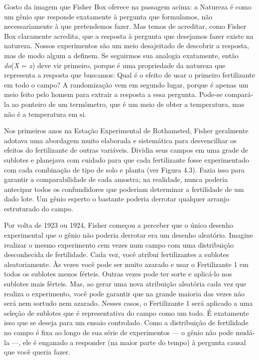 \documentclass[11pt,a5paper,twoside]{book}
\begin{document}
Gosto da imagem que Fisher Box oferece na passagem acima: a Natureza é como um gênio que responde exatamente à pergunta que formulamos, não necessariamente à que pretendemos fazer. Mas temos de acreditar, como Fisher Box claramente acredita, que a resposta à pergunta que desejamos fazer existe na natureza. Nossos experimentos são um meio desajeitado de descobrir a resposta, mas de modo algum a definem. Se seguirmos sua analogia exatamente, então \textit{do}(\textit{X} = \textit{x}) deve vir primeiro, porque é uma propriedade da natureza que representa a resposta que buscamos: Qual é o efeito de usar o primeiro fertilizante em todo o campo? A randomização vem em segundo lugar, porque é apenas um meio feito pelo homem para extrair a resposta a essa pergunta. Pode-se compará-la ao ponteiro de um termômetro, que é um meio de obter a temperatura, mas não é a temperatura em si.

Nos primeiros anos na Estação Experimental de Rothamsted, Fisher geralmente adotava uma abordagem muito elaborada e sistemática para desvencilhar os efeitos do fertilizante de outras variáveis. Dividia seus campos em uma grade de sublotes e planejava com cuidado para que cada fertilizante fosse experimentado com cada combinação de tipo de solo e planta (ver Figura 4.3). Fazia isso para garantir a comparabilidade de cada amostra; na realidade, nunca poderia antecipar todos os confundidores que poderiam determinar a fertilidade de um dado lote. Um gênio esperto o bastante poderia derrotar qualquer arranjo estruturado do campo.

Por volta de 1923 ou 1924, Fisher começou a perceber que o único desenho experimental que o gênio não poderia derrotar era um desenho aleatório. Imagine realizar o mesmo experimento cem vezes num campo com uma distribuição desconhecida de fertilidade. Cada vez, você atribui fertilizantes a sublotes aleatoriamente. Às vezes você pode ser muito azarado e usar o Fertilizante 1 em todos os sublotes menos férteis. Outras vezes pode ter sorte e aplicá-lo nos sublotes mais férteis. Mas, ao gerar uma nova atribuição aleatória cada vez que realiza o experimento, você pode garantir que na grande maioria das vezes não será nem sortudo nem azarado. Nesses casos, o Fertilizante 1 será aplicado a uma seleção de sublotes que é representativa do campo como um todo. É exatamente isso que se deseja para um ensaio controlado. Como a distribuição de fertilidade no campo é fixa ao longo de sua série de experimentos — o gênio não pode mudá-la —, ele é enganado a responder (na maior parte do tempo) à pergunta causal que você queria fazer.
\end{document}
